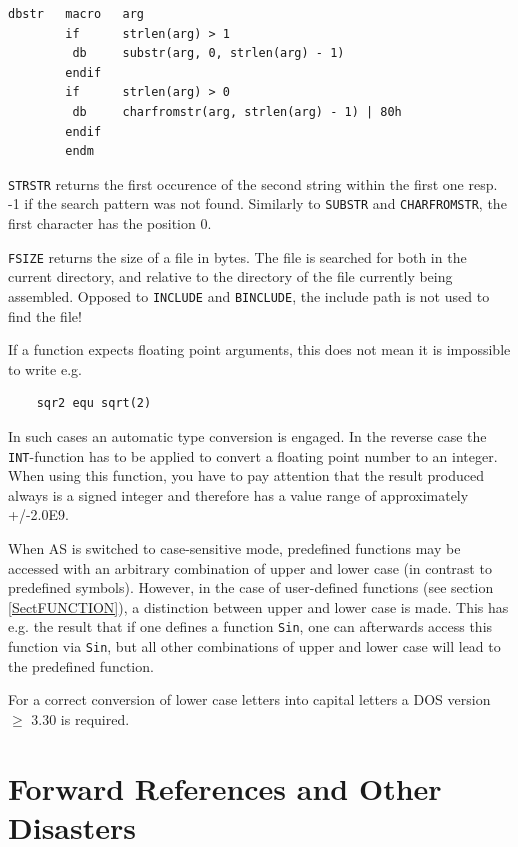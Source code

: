 \documentclass[12pt,twoside]{report}
\newcommand{\tty}[1]{{\tt #1}}
\newcommand{\asname}{{AS}}
\begin{document}
\begin{verbatim}
dbstr   macro   arg
        if      strlen(arg) > 1
         db     substr(arg, 0, strlen(arg) - 1)
        endif
        if      strlen(arg) > 0
         db     charfromstr(arg, strlen(arg) - 1) | 80h
        endif
        endm
\end{verbatim}

\tty{STRSTR} returns the first occurence of the second string
within the first one resp. -1 if the search pattern was not found.
Similarly to \tty{SUBSTR} and  \tty{CHARFROMSTR}, the first character
has the position 0.

\tty{FSIZE} returns the size of a file in bytes.  The file is
searched for both in the current directory, and relative to
the directory of the file currently being assembled.  Opposed
to \tty{INCLUDE} and \tty{BINCLUDE}, the include path is
not used to find the file!

If a function expects floating point arguments, this does not mean it
is impossible to write e.g.
\begin{verbatim}
    sqr2 equ sqrt(2)
\end{verbatim}
In such cases an automatic type conversion is engaged. In the reverse
case the \tty{INT}-function has to be applied to convert a floating point
number to an integer.  When using this function, you have to pay
attention that the result produced always is a signed integer and
therefore has a value range of approximately +/-2.0E9.

When \asname{} is switched to case-sensitive mode, predefined functions may be
accessed with an arbitrary combination of upper and lower case (in
contrast to predefined symbols).  However, in the case of user-defined
functions (see section \ref{SectFUNCTION}), a distinction between upper
and lower case is made.  This has e.g. the result that if one defines a
function \tty{Sin}, one can afterwards access this function via \tty{Sin}, but all
other combinations of upper and lower case will lead to the predefined
function.

For a correct conversion  of lower case letters
into capital letters a DOS version $\geq$ 3.30 is required.


\section{Forward References and Other Disasters}
\label{ForwRefs}
\end{document}
